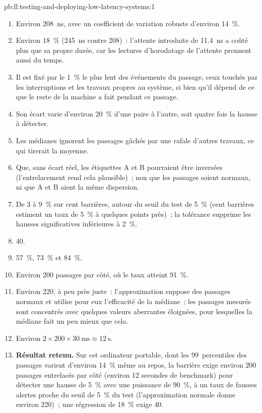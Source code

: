 \begin{solution}{pb:ll:testing-and-deploying-low-latency-systems:1}
\begin{enumerate}
\item Environ \qty{208}{\nano\second}, avec un coefficient de variation robuste d'environ 14~\%.
\item Environ 18~\% (\qty{245}{\nano\second} contre 208)~: l'attente introduite de \qty{11.4}{\nano\second} a coûté plus que sa propre durée,
car les lectures d'horodatage de l'attente prennent aussi du temps.
\item Il est fixé par le 1~\% le plus lent des événements du passage, ceux touchés par les interruptions et les travaux propres au système, si bien qu'il dépend de
ce que le reste de la machine a fait pendant ce passage.
\item Son écart varie d'environ 20~\% d'une paire à l'autre, soit quatre fois la hausse à détecter.
\item Les médianes ignorent les passages gâchés par une rafale d'autres travaux, ce qui tirerait la moyenne.
\item Que, sans écart réel, les étiquettes A et B pourraient être inversées (l'entrelacement rend cela plausible)~; non que
les passages soient normaux, ni que A et B aient la même dispersion.
\item De 3 à 9~\% sur cent barrières, autour du seuil du test de 5~\% (cent barrières estiment un taux de 5~\% à quelques
points près)~; la tolérance supprime les hausses significatives inférieures à 2~\%.
\item 40.
\item 57~\%, 73~\% et 84~\%.
\item Environ 200 passages par côté, où le taux atteint 91~\%.
\item Environ 220, à peu près juste~: l'approximation suppose des passages normaux et utilise pour eux l'efficacité de la médiane~; les passages mesurés
sont concentrés avec quelques valeurs aberrantes éloignées, pour lesquelles la médiane fait un peu mieux que cela.
\item Environ $2 \times 200 \times \qty{30}{\milli\second} \approx \qty{12}{\second}$.
\item \textbf{Résultat retenu.} Sur cet ordinateur portable, dont les 99~percentiles des passages varient d'environ 14~\% même au repos,
la barrière exige environ 200 passages entrelacés par côté (environ 12 secondes de benchmark) pour détecter une hausse de 5~\% avec une puissance de 90~\%, à un
taux de fausses alertes proche du seuil de 5~\% du test (l'approximation normale donne environ 220)~; une régression de 18~\% exige 40.

\end{enumerate}
\end{solution}
